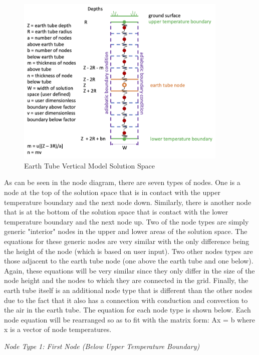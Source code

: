 \begin{figure}[hbtp]
\centering
\includegraphics[width=0.9\textwidth, height=0.9\textheight, keepaspectratio=true]{media/earth_tube_solution_space_diagram.png}
\caption{Earth Tube Vertical Model Solution Space \protect \label{fig:earth-tube-solution-space-diagram}}
\end{figure}

As can be seen in the node diagram, there are seven types of nodes.  One is a node at the top of the solution space that is in contact with the upper temperature boundary and the next node down.  Similarly, there is another node that is at the bottom of the solution space that is contact with the lower temperature boundary and the next node up.  Two of the node types are simply generic "interior" nodes in the upper and lower areas of the solution space.  The equations for these generic nodes are very similar with the only difference being the height of the node (which is based on user input).  Two other nodes types are those adjacent to the earth tube node (one above the earth tube and one below).  Again, these equations will be very similar since they only differ in the size of the node height and the nodes to which they are connected in the grid.  Finally, the earth tube itself is an additional node type that is different than the other nodes due to the fact that it also has a connection with conduction and convection to the air in the earth tube.  The equation for each node type is shown below.  Each node equation will be rearranged so as to fit with the matrix form: Ax = b where x is a vector of node temperatures.

\emph{\textit{Node Type 1: First Node (Below Upper Temperature Boundary)}}

